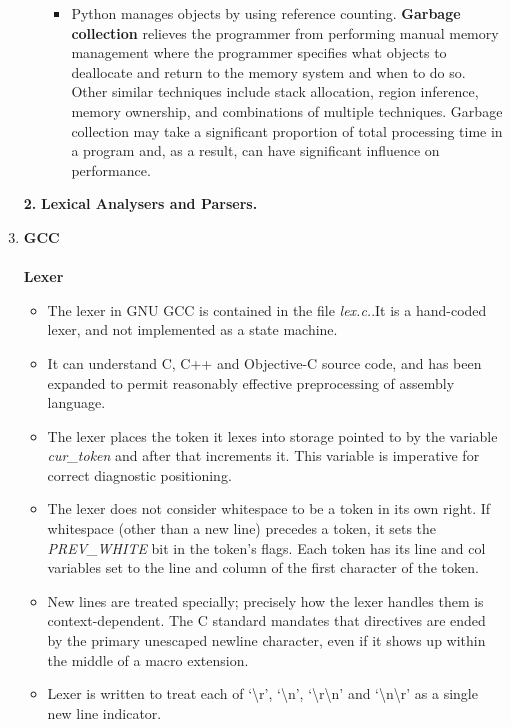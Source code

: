\documentclass[english,a4paper,12pt]{article}
\begin{document}
\begin{enumerate}
\begin{itemize}
\begin{itemize}
        \item Python manages objects by using reference counting. \textbf{Garbage collection} relieves the programmer from performing manual memory management where the programmer specifies what objects to deallocate and return to the memory system and when to do so. Other similar techniques include stack allocation, region inference, memory ownership, and combinations of multiple techniques. Garbage collection may take a significant proportion of total processing time in a program and, as a result, can have significant influence on performance.
    \end{itemize}
\end{itemize}
\newpage
\item[\textbf{2.}] \large{\textbf{Lexical Analysers and Parsers.}} \\
    \item {\textbf{GCC}}\\~\\
        \textbullet \textbf{Lexer}
        \begin{itemize}
            \item The lexer in GNU GCC is contained in the file \textit{lex.c.}.It is a hand-coded lexer, and not implemented as a state machine.
            \item It can understand C, C++ and Objective-C source code, and has been expanded to permit reasonably effective preprocessing of assembly language.
            \item The lexer places the token it lexes into storage pointed to by the variable \textit{cur\_token} and after that increments it. This variable is imperative for correct diagnostic positioning.
            \item The lexer does not consider whitespace to be a token in its own right. If whitespace (other than a new line) precedes a token, it sets the \textit{PREV\_WHITE} bit in the token’s flags. Each token has its line and col variables set to the line and column of the first character of the token.
            \item New lines are treated specially; precisely how the lexer handles them is context-dependent. The C standard mandates that directives are ended by the primary unescaped newline character, even if it shows up within the middle of a macro extension.
            \item Lexer is written to treat each of ‘\textbackslash r’, ‘\textbackslash n’, ‘\textbackslash r\textbackslash n’ and ‘\textbackslash n\textbackslash r’ as a single new line indicator. 
        \end{itemize}
    

\end{enumerate}
\end{document}
